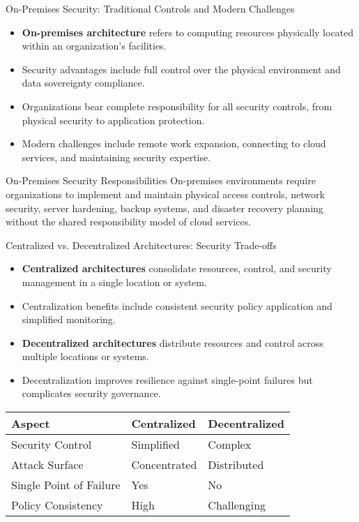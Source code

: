 \documentclass{beamer}
\begin{document}
    \begin{frame}{On-Premises Security: Traditional Controls and Modern Challenges}
    \begin{itemize}
    \item \textbf{On-premises architecture} refers to computing resources physically located within an organization's facilities.
    \item Security advantages include full control over the physical environment and data sovereignty compliance.
    \item Organizations bear complete responsibility for all security controls, from physical security to application protection.
    \item Modern challenges include remote work expansion, connecting to cloud services, and maintaining security expertise.
    \end{itemize}
    
    \begin{exampleblock}{On-Premises Security Responsibilities}
    On-premises environments require organizations to implement and maintain physical access controls, network security, server hardening, backup systems, and disaster recovery planning without the shared responsibility model of cloud services.
    \end{exampleblock}
    \end{frame}
    
    \begin{frame}{Centralized vs. Decentralized Architectures: Security Trade-offs}
    \begin{itemize}
    \item \textbf{Centralized architectures} consolidate resources, control, and security management in a single location or system.
    \item Centralization benefits include consistent security policy application and simplified monitoring.
    \item \textbf{Decentralized architectures} distribute resources and control across multiple locations or systems.
    \item Decentralization improves resilience against single-point failures but complicates security governance.
    \end{itemize}
    
    \begin{table}
    \begin{tabular}{lll}
    \toprule
    \textbf{Aspect} & \textbf{Centralized} & \textbf{Decentralized} \\
    \midrule
    Security Control & Simplified & Complex \\
    Attack Surface & Concentrated & Distributed \\
    Single Point of Failure & Yes & No \\
    Policy Consistency & High & Challenging \\
    \bottomrule
    \end{tabular}
    \end{table}
    \end{frame}
    
\end{document}
